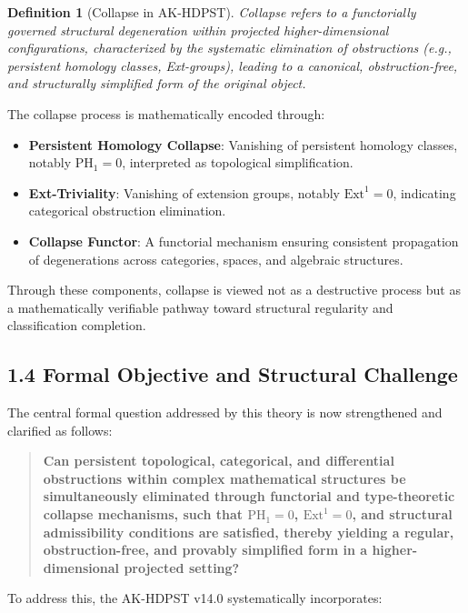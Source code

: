 \documentclass[11pt]{article}
\newtheorem{definition}[theorem]{Definition}
\begin{document}
\begin{definition}[Collapse in AK-HDPST]
Collapse refers to a functorially governed structural degeneration within projected higher-dimensional configurations,  
characterized by the systematic elimination of obstructions (e.g., persistent homology classes, Ext-groups),  
leading to a canonical, obstruction-free, and structurally simplified form of the original object.
\end{definition}

The collapse process is mathematically encoded through:

\begin{itemize}
    \item \textbf{Persistent Homology Collapse}: Vanishing of persistent homology classes, notably $\mathrm{PH}_1 = 0$, interpreted as topological simplification.
    \item \textbf{Ext-Triviality}: Vanishing of extension groups, notably $\mathrm{Ext}^1 = 0$, indicating categorical obstruction elimination.
    \item \textbf{Collapse Functor}: A functorial mechanism ensuring consistent propagation of degenerations across categories, spaces, and algebraic structures.
\end{itemize}

Through these components, collapse is viewed not as a destructive process but as a mathematically verifiable pathway toward structural regularity and classification completion.

\subsection*{1.4 Formal Objective and Structural Challenge}

The central formal question addressed by this theory is now strengthened and clarified as follows:

\begin{quote}
\textbf{Can persistent topological, categorical, and differential obstructions within complex mathematical structures  
be simultaneously eliminated through functorial and type-theoretic collapse mechanisms,  
such that $\mathrm{PH}_1 = 0$, $\mathrm{Ext}^1 = 0$, and structural admissibility conditions are satisfied,  
thereby yielding a regular, obstruction-free, and provably simplified form in a higher-dimensional projected setting?}
\end{quote}

To address this, the AK-HDPST v14.0 systematically incorporates:
\end{document}
